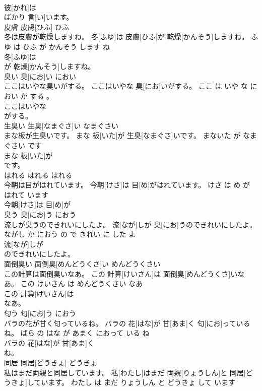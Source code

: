 \documentclass[8pt]{extreport}
\begin{document}
\begin{CJK}{UTF8}{min}
\\	彼[かれ]は
\\	ばかり 言[い]います。			
\\	皮膚	皮膚[ひふ]	ひふ	
\\	冬は皮膚が乾燥しますね。	冬[ふゆ]は 皮膚[ひふ]が 乾燥[かんそう]しますね。	ふゆ は ひふ が かんそう します ね	
\\	冬[ふゆ]は
\\	が 乾燥[かんそう]しますね。			
\\	臭い	臭[にお]い	におい	
\\	ここはいやな臭いがする。	ここはいやな 臭[にお]いがする。	ここ は いや な におい が する 。	
\\	ここはいやな
\\	がする。			
\\	生臭い	生臭[なまぐさ]い	なまぐさい	
\\	まな板が生臭いです。	まな 板[いた]が 生臭[なまぐさ]いです。	まないた が なまぐさい です	
\\	まな 板[いた]が
\\	です。			
\\	はれる	はれる	はれる	
\\	今朝は目がはれています。	今朝[けさ]は 目[め]がはれています。	けさ は め が はれて います	
\\	今朝[けさ]は 目[め]が
\\	臭う	臭[にお]う	におう	
\\	流しが臭うのできれいにしたよ。	流[なが]しが 臭[にお]うのできれいにしたよ。	ながし が におう の で きれい に した よ	
\\	流[なが]しが
\\	のできれいにしたよ。			
\\	面倒臭い	面倒臭[めんどうくさ]い	めんどうくさい	
\\	この計算は面倒臭いなあ。	この 計算[けいさん]は 面倒臭[めんどうくさ]いなあ。	この けいさん は めんどうくさい なあ	
\\	この 計算[けいさん]は
\\	なあ。			
\\	匂う	匂[にお]う	におう	
\\	バラの花が甘く匂っているね。	バラの 花[はな]が 甘[あま]く 匂[にお]っているね。	ばら の はな が あまく におって いる ね	
\\	バラの 花[はな]が 甘[あま]く
\\	ね。			
\\	同居	同居[どうきょ]	どうきょ	
\\	私はまだ両親と同居しています。	私[わたし]はまだ 両親[りょうしん]と 同居[どうきょ]しています。	わたし は まだ りょうしん と どうきょ して います	

\end{CJK}
\end{document}
